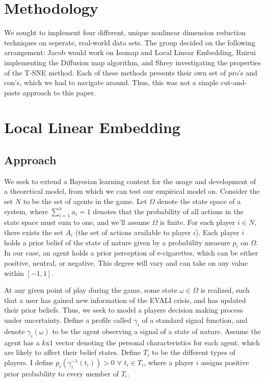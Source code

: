 \documentclass[12pt]{article}
\begin{document}
\section{Methodology} \label{sec:methodology}

\hspace{5mm}We sought to implement four different, unique nonlinear dimension reduction techniques on seperate, real-world data sets. The group decided on the following arrangement: Jacob would work on Isomap and Local Linear Embedding, Ruirui implementing the Diffusion map algorithm, and Shrey investigating the properties of the T-SNE method. Each of these methods presents their own set of pro's and con's, which we had to navigate around. Thus, this was not a simple cut-and-paste approach to this paper.  



\section{Local Linear Embedding} \label{sec:Local Linear Embedding}


\subsection{Approach}
\hspace{5mm}We seek to extend a Bayesian learning context for the usage and development of a theoretical model, from which we can test our empirical model on. Consider the set $N$ to be the set of agents in the game. Let $\Omega$ denote the state space of a system, where $\sum\limits_{i=1}^{n}a_i=1$ denotes that the probability of all actions in the state space must sum to one, and we'll assume $\Omega$ is finite. For each player $i\in N$, there exists the set $A_i$ (the set of actions available to player $i$). Each player $i$ holds a prior belief of the state of nature given by a probability measure $p_i$ on $\Omega$. In our case, an agent holds a prior perception of e-cigarettes, which can be either positive, neutral, or negative. This degree will vary and can take on any value within $[-1,1]$. 

At any given point of play during the game, some state $\omega\in\Omega$ is realized, such that a user has gained new information of the EVALI crisis, and has updated their prior beliefs. Thus, we seek to model a players decision making process under uncertainty. Define a profile called $\gamma_i$ of a standard signal function, and denote $\gamma_i(\omega)$ to be the agent observing a signal of a state of nature. Assume the agent has a $k$x$1$ vector denoting the personal characteristics for each agent, which are likely to affect their belief states. Define $T_i$ to be the different types of players. I define $p_i(\gamma_i^{-1}(t_i))>0$ $\forall$ $t_i\in T_i$, where a player $i$ assigns positive prior probability to every member of $T_i$.
\end{document}
